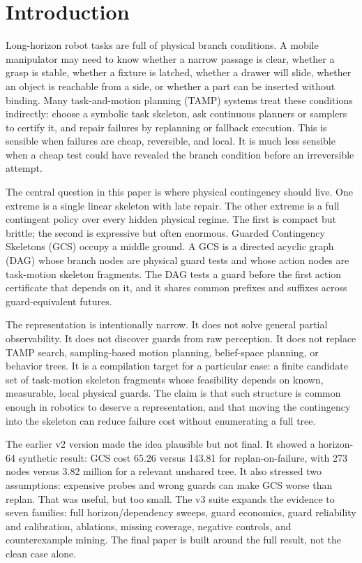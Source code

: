 \documentclass{article}
\begin{document}
\section{Introduction}
Long-horizon robot tasks are full of physical branch conditions. A mobile manipulator may need to know whether a narrow passage is clear, whether a grasp is stable, whether a fixture is latched, whether a drawer will slide, whether an object is reachable from a side, or whether a part can be inserted without binding. Many task-and-motion planning (TAMP) systems treat these conditions indirectly: choose a symbolic task skeleton, ask continuous planners or samplers to certify it, and repair failures by replanning or fallback execution. This is sensible when failures are cheap, reversible, and local. It is much less sensible when a cheap test could have revealed the branch condition before an irreversible attempt.

The central question in this paper is where physical contingency should live. One extreme is a single linear skeleton with late repair. The other extreme is a full contingent policy over every hidden physical regime. The first is compact but brittle; the second is expressive but often enormous. Guarded Contingency Skeletons (GCS) occupy a middle ground. A GCS is a directed acyclic graph (DAG) whose branch nodes are physical guard tests and whose action nodes are task-motion skeleton fragments. The DAG tests a guard before the first action certificate that depends on it, and it shares common prefixes and suffixes across guard-equivalent futures.

The representation is intentionally narrow. It does not solve general partial observability. It does not discover guards from raw perception. It does not replace TAMP search, sampling-based motion planning, belief-space planning, or behavior trees. It is a compilation target for a particular case: a finite candidate set of task-motion skeleton fragments whose feasibility depends on known, measurable, local physical guards. The claim is that such structure is common enough in robotics to deserve a representation, and that moving the contingency into the skeleton can reduce failure cost without enumerating a full tree.

The earlier v2 version made the idea plausible but not final. It showed a horizon-64 synthetic result: GCS cost 65.26 versus 143.81 for replan-on-failure, with 273 nodes versus 3.82 million for a relevant unshared tree. It also stressed two assumptions: expensive probes and wrong guards can make GCS worse than replan. That was useful, but too small. The v3 suite expands the evidence to seven families: full horizon/dependency sweeps, guard economics, guard reliability and calibration, ablations, missing coverage, negative controls, and counterexample mining. The final paper is built around the full result, not the clean case alone.
\end{document}
